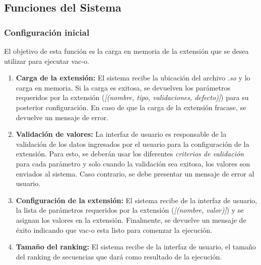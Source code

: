 \documentclass[10pt,a4paper]{article}
\begin{document}
  \subsection{Funciones del Sistema}

  \subsubsection{Configuraci\'on inicial}
  El objetivo de esta funci\'on es la carga en memoria de la extensi\'on que se desea utilizar para ejecutar vac-o.
  \begin{enumerate}
    \item \textbf{Carga de la extensi\'on:}
    El sistema recibe la ubicaci\'on del archivo \textit{.so} y lo carga en memoria. Si la carga es exitosa, se devuelven los par\'ametros requeridos por la extensi\'on (\textit{[(nombre, tipo, validaciones, defecto)]}) para su posterior configuraci\'on. En caso de que la carga de la extensi\'on fracase, se devuelve un mensaje de error.
    
    \item \textbf{Validaci\'on de valores:}
    La interfaz de usuario es responsable de la validaci\'on de los datos ingresados por el usuario para la configuraci\'on de la extensi\'on. Para esto, se deber\'an usar los diferentes \textit{criterios de validaci\'on} para cada par\'ametro y solo cuando la validaci\'on sea exitosa, los valores son enviados al sistema. Caso contrario, se debe presentar un mensaje de error al usuario.
    
    \item \textbf{Configuraci\'on de la extensi\'on:}
    El sistema recibe de la interfaz de usuario, la lista de par\'ametros requeridos por la extensi\'on (\textit{[(nombre, valor)]}) y se asignan los valores en la extensi\'on. Finalmente, se devuelve un mensaje de \'exito indicando que vac-o esta listo para comenzar la ejecuci\'on.

    \item \textbf{Tama\~no del ranking:}
    El sistema recibe de la interfaz de usuario, el tama\~no del ranking de secuencias que dar\'a como resultado de la ejecuci\'on.
  \end{enumerate}
\end{document}
